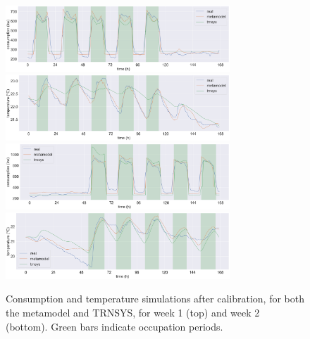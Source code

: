 \documentclass[12pt]{article}
\begin{document}
\begin{figure}
    \centering
    \includegraphics[width=0.75\textwidth]{calib_week1_private.png}
    \includegraphics[width=0.75\textwidth]{calib_week1_t_int.png}
    \includegraphics[width=0.75\textwidth]{calib_week2_private.png}
    \includegraphics[width=0.75\textwidth]{calib_week2_t_int.png}
    \caption{Consumption and temperature simulations after calibration, for both the metamodel and TRNSYS, for week 1 (top) and week 2 (bottom). Green bars indicate occupation periods.}%
    \label{fig:calib}
\end{figure}
\end{document}
